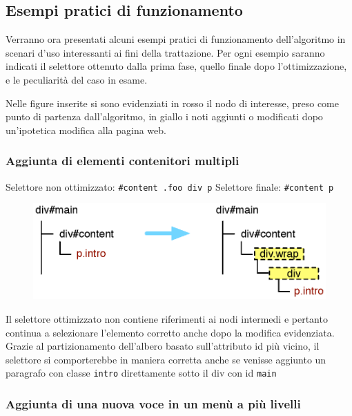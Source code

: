\subsection {Esempi pratici di funzionamento}

Verranno ora presentati alcuni esempi pratici di funzionamento dell'algoritmo in scenari d'uso interessanti ai fini della trattazione. Per ogni esempio saranno indicati il selettore ottenuto dalla prima fase, quello finale dopo l'ottimizzazione, e le peculiarità del caso in esame.

Nelle figure inserite si sono evidenziati in rosso il nodo di interesse, preso come punto di partenza dall'algoritmo, in giallo i noti aggiunti o modificati dopo un'ipotetica modifica alla pagina web.

\subsubsection {Aggiunta di elementi contenitori multipli}

Selettore non ottimizzato:  \verb|#content .foo div p| 
\newline
Selettore finale:  \verb|#content p| 

\begin{figure}[htbp]
\begin{center}
\includegraphics[width=\textwidth]{images/dom_examples/wrap.eps}
\end{center}
\end{figure}

Il selettore ottimizzato non contiene riferimenti ai nodi intermedi e pertanto continua a selezionare l'elemento corretto anche dopo la modifica evidenziata. Grazie al partizionamento dell'albero basato sull'attributo id più vicino, il selettore si comporterebbe in maniera corretta anche se venisse aggiunto un paragrafo con classe \verb|intro| direttamente sotto il div con id \verb|main|

\subsubsection {Aggiunta di una nuova voce in un menù a più livelli}

